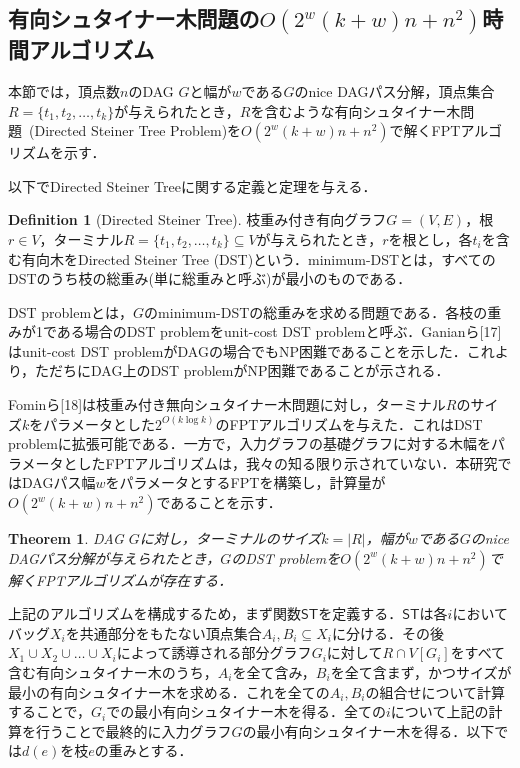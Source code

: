 \documentclass[master]{kuisthesis}		%
\theoremstyle{plain}
\newtheorem{theorem}{Theorem}
\theoremstyle{definition}
\newtheorem{definition*}{Definition}
\begin{document}
\subsection{有向シュタイナー木問題の$O(2^w(k+w)n + n^2)$時間アルゴリズム}

本節では，頂点数$n$のDAG $G$と幅が$w$である$G$のnice DAGパス分解，頂点集合$R=\{t_1, t_2, \dots, t_k\}$が与えられたとき，$R$を含むような有向シュタイナー木問題\ (Directed Steiner Tree Problem)を$O(2^w(k+w)n + n^2)$で解くFPTアルゴリズムを示す．


以下でDirected Steiner Treeに関する定義と定理を与える．

\begin{definition*}[Directed Steiner Tree]
    枝重み付き有向グラフ$G=(V, E)$，根$r \in V$，ターミナル$R=\{t_1, t_2, \dots, t_k\} \subseteq V$が与えられたとき，$r$を根とし，各$t_i$を含む有向木をDirected Steiner Tree (DST)という．minimum-DSTとは，すべてのDSTのうち枝の総重み(単に総重みと呼ぶ)が最小のものである．
\end{definition*}

DST problemとは，$G$のminimum-DSTの総重みを求める問題である．各枝の重みが1である場合のDST problemをunit-cost DST problemと呼ぶ．Ganianら[17]はunit-cost DST problemがDAGの場合でもNP困難であることを示した．これより，ただちにDAG上のDST problemがNP困難であることが示される．


Fominら[18]は枝重み付き無向シュタイナー木問題に対し，ターミナル$R$のサイズ$k$をパラメータとした$2^{O(k\log k)}$のFPTアルゴリズムを与えた．これはDST problemに拡張可能である．一方で，入力グラフの基礎グラフに対する木幅をパラメータとしたFPTアルゴリズムは，我々の知る限り示されていない．本研究ではDAGパス幅$w$をパラメータとするFPTを構築し，計算量が$O(2^w(k+w)n + n^2)$であることを示す．

\begin{theorem}
    DAG $G$に対し，ターミナルのサイズ$k=|R|$，幅が$w$である$G$のnice DAGパス分解が与えられたとき，$G$のDST problemを$O(2^w(k+w)n + n^2)$で解くFPTアルゴリズムが存在する．
\end{theorem}

上記のアルゴリズムを構成するため，まず関数$\mathsf{ST}$を定義する．$\mathsf{ST}$は各$i$においてバッグ$X_i$を共通部分をもたない頂点集合$A_i, B_i \subseteq X_i$に分ける．その後$X_1 \cup X_2 \cup \dots \cup X_i$によって誘導される部分グラフ$G_i$に対して$R\cap V[G_i]$をすべて含む有向シュタイナー木のうち，$A_i$を全て含み，$B_i$を全て含まず，かつサイズが最小の有向シュタイナー木を求める．これを全ての$A_i, B_i$の組合せについて計算することで，$G_i$での最小有向シュタイナー木を得る．全ての$i$について上記の計算を行うことで最終的に入力グラフ$G$の最小有向シュタイナー木を得る．以下では$d(e)$を枝$e$の重みとする．
\end{document}
